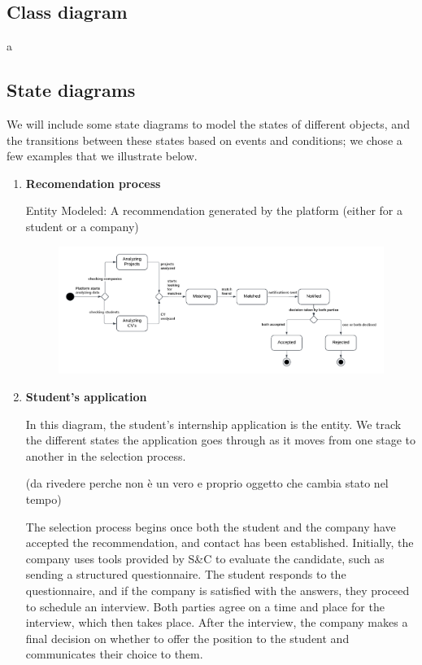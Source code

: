 \subsection{Class diagram}
a

\subsection{State diagrams}
We will include some state diagrams to model the states of different objects, and the transitions between these states based on events and conditions; we chose a few examples that we illustrate below.
\begin{enumerate}

\item \textbf{Recomendation process}

Entity Modeled: A recommendation generated by the platform (either for a student or a company)


\begin{figure}[H]
    \centering
    \includegraphics[width=1\linewidth]{RASD//Images/recomendation.png}
    \caption{}
    \label{fig:enter-label}
\end{figure}

\item \textbf{Student's application}

In this diagram, the student's internship application is the entity. We track the different states the application goes through as it moves from one stage to another in the selection process.

(da rivedere perche non è un vero e proprio oggetto che cambia stato nel tempo)

The selection process begins once both the student and the company have accepted the recommendation, and contact has been established. Initially, the company uses tools provided by S\&C to evaluate the candidate, such as sending a structured questionnaire. The student responds to the questionnaire, and if the company is satisfied with the answers, they proceed to schedule an interview. Both parties agree on a time and place for the interview, which then takes place. After the interview, the company makes a final decision on whether to offer the position to the student and communicates their choice to them.


\end{enumerate}
